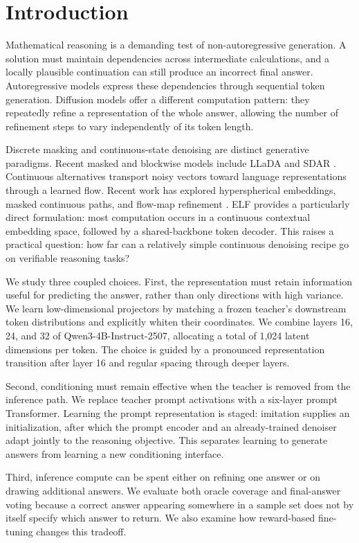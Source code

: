 \section{Introduction}
Mathematical reasoning is a demanding test of non-autoregressive generation. A solution must maintain dependencies across intermediate calculations, and a locally plausible continuation can still produce an incorrect final answer. Autoregressive models express these dependencies through sequential token generation. Diffusion models offer a different computation pattern: they repeatedly refine a representation of the whole answer, allowing the number of refinement steps to vary independently of its token length.

Discrete masking and continuous-state denoising are distinct generative paradigms. Recent masked and blockwise models include LLaDA and SDAR \citep{llada,sdar}. Continuous alternatives transport noisy vectors toward language representations through a learned flow. Recent work has explored hyperspherical embeddings, masked continuous paths, and flow-map refinement \citep{hyperspherical,mlfm,posterior}. ELF \citep{elf} provides a particularly direct formulation: most computation occurs in a continuous contextual embedding space, followed by a shared-backbone token decoder. This raises a practical question: how far can a relatively simple continuous denoising recipe go on verifiable reasoning tasks?

We study three coupled choices. First, the representation must retain information useful for predicting the answer, rather than only directions with high variance. We learn low-dimensional projectors by matching a frozen teacher's downstream token distributions and explicitly whiten their coordinates. We combine layers 16, 24, and 32 of Qwen3-4B-Instruct-2507, allocating a total of 1,024 latent dimensions per token. The choice is guided by a pronounced representation transition after layer 16 and regular spacing through deeper layers.

Second, conditioning must remain effective when the teacher is removed from the inference path. We replace teacher prompt activations with a six-layer prompt Transformer. Learning the prompt representation is staged: imitation supplies an initialization, after which the prompt encoder and an already-trained denoiser adapt jointly to the reasoning objective. This separates learning to generate answers from learning a new conditioning interface.

Third, inference compute can be spent either on refining one answer or on drawing additional answers. We evaluate both oracle coverage and final-answer voting because a correct answer appearing somewhere in a sample set does not by itself specify which answer to return. We also examine how reward-based fine-tuning changes this tradeoff.


